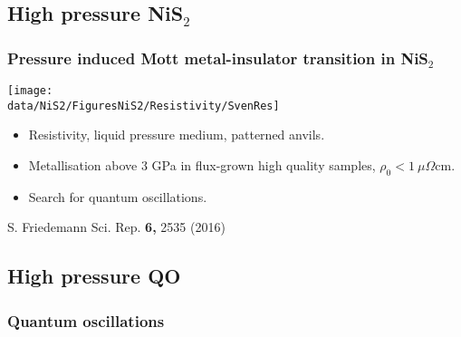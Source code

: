 \subsection{High pressure NiS$_2$}
\begin{frame}[label=NiS2-1]
\frametitle{Pressure induced Mott metal-insulator transition in NiS$_2$}
\centerline{\texttt{[image: \\data/NiS2/FiguresNiS2/Resistivity/SvenRes]}}
\begin{itemize}
\item
Resistivity, liquid pressure medium, patterned anvils.

\item
Metallisation above 3 GPa in flux-grown high quality samples,
$\rho_0 < 1~\mu \Omega \mathrm {cm}$.

\item 
Search for quantum oscillations.

\end{itemize}
\vspace*{\fill}
\vspace{-0.25em}
\centerline{\makebox[\linewidth]{\rule{0.85\textwidth}{0.4pt}}}
\centerline{\scriptsize S. Friedemann Sci. Rep. {\bf 6,} 2535 (2016)}
\end{frame}

\subsection{High pressure QO}
\begin{frame}[label=QuantOsc]
\frametitle{Quantum oscillations}




\end{frame}

